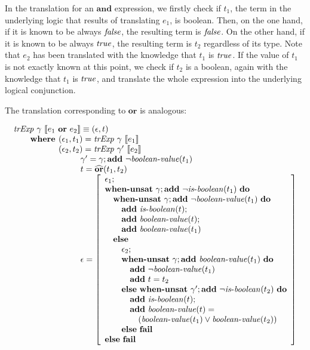 In the translation for an $\mathbf{and}$ expression, we firstly check if $t_1$,
the term in the underlying logic that results of translating $e_1$, is boolean.
Then, on the one hand, if it is known to be always $\mathit{false}$, the resulting term
is $\mathit{false}$.  On the other hand, if it is known to be always $\mathit{true}$, the
resulting term is $t_2$ regardless of its type. Note that $e_2$ has been
translated with the knowledge that $t_1$ is $\mathit{true}$. If the value of $t_1$ is
not exactly known at this point, we check if $t_2$ is a boolean, again with the
knowledge that $t_1$ is $\mathit{true}$, and translate the whole expression into the
underlying logical conjunction.

The translation corresponding to $\mathbf{or}$ is analogous:

\[
\begin{array}{l}
\trExp{\gamma}{\orE{e_1}{e_2}} \equiv (\epsilon, t)\\
\qquad \textbf{where }(\epsilon_1, t_1) = \trExp{\gamma}{e_1}\\
\qquad \phantom{\textbf{where }}(\epsilon_2, t_2) = \trExp{\gamma'}{e_2}\\
\qquad\qquad\qquad\qquad \gamma' = \gamma;\addE~\neg\booleanvalue{t_1}\\
\qquad\qquad\qquad\qquad t = \widehat{\mathbf{or}}(t_1, t_2)\\
\qquad\qquad\qquad\qquad \epsilon = \left[ 
\begin{array}{l}
\epsilon_1;\\
\whenUnsatW~\gamma;\addE~\neg\isboolean{t_1}~\doW\\
\quad\whenUnsatW~\gamma;\addE~\neg\booleanvalue{t_1}~\doW\\
\quad\quad\addE~\isboolean{t};\\
\quad\quad\addE~\booleanvalue{t};\\
\quad\quad\addE~\booleanvalue{t_1}\\
\quad\elseW\\
\quad\quad\epsilon_2;\\
\quad\quad\whenUnsatW~\gamma;\addE~\booleanvalue{t_1}~\doW\\
\quad\quad\quad\addE~\neg\booleanvalue{t_1}\\
\quad\quad\quad\addE~t = t_2\\
\quad\quad\elseW~\whenUnsatW~\gamma';\addE~\neg\isboolean{t_2}~\doW\\
\quad\quad\quad\addE~\isboolean{t};\\
\quad\quad\quad\addE~\booleanvalue{t} = \\
\quad\quad\quad\quad(\booleanvalue{t_1} \lor \booleanvalue{t_2})\\
\quad\quad\elseW~\failE\\
\elseW~\failE
\end{array}
\right] \\
\end{array}
\]

